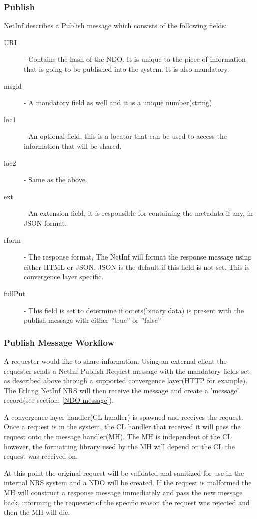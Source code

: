 \subsubsection{Publish}

NetInf describes a Publish message which consists of the following fields:

\begin{description}
\item[URI]  - Contains the hash of the NDO. It is unique to the piece of information that is going to be published into the system. It is also mandatory.
\item[msgid] - A mandatory field as well and it is a unique number(string). 
\item[loc1] - An optional field, this is a locator that can be used to access the information that will be shared.
\item[loc2] - Same as the above.
\item[ext] - An extension field, it is responsible for containing the metadata if any, in JSON format.
\item[rform] - The response format, The NetInf will format the response message using either HTML or JSON. JSON is the default if this field is not set. This is convergence layer specific.
\item[fullPut] - This field is set to determine if octets(binary data) is present with the publish message with either ''true'' or ''false''
\end{description}

\subsubsection{Publish Message Workflow}

A requester would like to share information. Using an external client the requester sends a NetInf Publish Request message with the mandatory fields set as described above through a supported convergence layer(HTTP for example). The Erlang NetInf NRS will then receive the message and create a 'message' record(see section: \ref{NDO-message}).

A convergence layer handler(CL handler) is spawned and receives the request.
Once a request is in the system, the CL handler that received it will pass the request onto the message handler(MH). The MH is independent of the CL however, the formatting library used by the MH will depend on the CL the request was received on.

At this point the original request will be validated and sanitized for use in the internal NRS system and a NDO will be created. If the request is malformed the MH will construct a response message immediately and pass the new message back, informing the requester of the specific reason the request was rejected and then the MH will die. 

